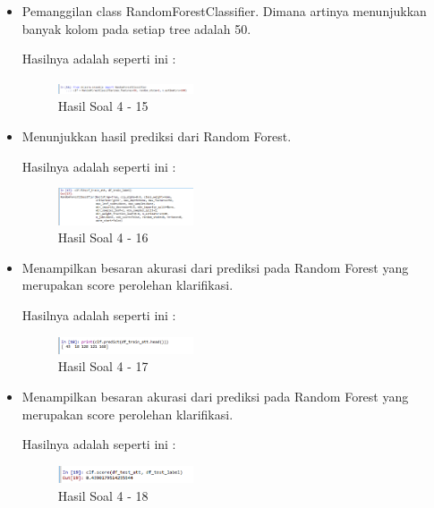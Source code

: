 \begin{enumerate}
\begin{itemize}
	\item Pemanggilan class RandomForestClassifier. Dimana artinya menunjukkan banyak kolom pada setiap tree adalah 50.
	
	Hasilnya adalah seperti ini :

	\begin{figure}[H]
	\centering
		\includegraphics[width=4cm]{figures/1174017/3/praktek/soal415.PNG}
		\caption{Hasil Soal 4 - 15}
	\end{figure}

	\item Menunjukkan hasil prediksi dari Random Forest.
	
	Hasilnya adalah seperti ini :

	\begin{figure}[H]
	\centering
		\includegraphics[width=4cm]{figures/1174017/3/praktek/soal416.PNG}
		\caption{Hasil Soal 4 - 16}
	\end{figure}

	\item Menampilkan besaran akurasi dari prediksi pada Random Forest yang merupakan score perolehan klarifikasi.
	
	Hasilnya adalah seperti ini :

	\begin{figure}[H]
	\centering
		\includegraphics[width=4cm]{figures/1174017/3/praktek/soal417.PNG}
		\caption{Hasil Soal 4 - 17}
	\end{figure}

	\item Menampilkan besaran akurasi dari prediksi pada Random Forest yang merupakan score perolehan klarifikasi.
	
	Hasilnya adalah seperti ini :

	\begin{figure}[H]
	\centering
		\includegraphics[width=4cm]{figures/1174017/3/praktek/soal418.PNG}
		\caption{Hasil Soal 4 - 18}
	\end{figure}
\end{itemize}


\end{enumerate}
